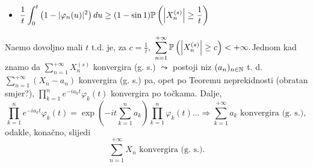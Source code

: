\documentclass{article}
\begin{document}
\begin{itemize}
    \item[] \(\displaystyle\frac1t\int_0^t\left(1-|\varphi_n(u)|^2\right)du\ge(1-\sin 1)\Bbb P\left(\left|X_n^{(s)}\right|\ge\frac1t\right)\)
\end{itemize}
Na\dj{}emo dovoljno mali \(t\) t.d. je, za \(c=\frac1t,\) \(\displaystyle\sum_{n=1}^{+\infty}\Bbb P\left(\left|X_n^{(s)}\right|\ge c\right)<+\infty.\)\newline\newline Jednom kad znamo da \(\displaystyle\sum_{n=1}^{+\infty}X_n^{(s)}\) konvergira (g. s.) \(\leadsto\) postoji niz \((a_n)_{n\in\Bbb N}\) t. d. \(\displaystyle\sum_{n=1}^{+\infty}(X_n-a_n)\) konvergira (g. s.) pa, opet po Teoremu neprekidnosti (obratan smjer?), \(\displaystyle\prod_{k=1}^ne^{-ia_kt}\varphi_k(t)\) konvergira po točkama. Dalje, \[\prod_{k=1}^ne^{-ia_kt}\varphi_k(t)=\exp\left(-it\sum_{k=1}^na_k\right)\prod_{k=1}^n\varphi_k(t)\ldots\Rightarrow\sum_{k=1}^{+\infty}a_k\text{ konvergira (g. s.)},\] odakle, konačno, slijedi \[\sum_{n=1}^{+\infty}X_n\text{ konvergira (g. s.)}.\] 
\newpage
\end{document}
